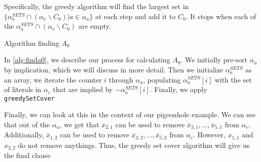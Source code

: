 Specifically, the greedy algorithm will find the largest set in $\{\alpha_a^{SETS} \cap (\alpha_c \backslash C_0) | a \in \alpha_a \}$ at each step and add it to $C_0$. It stops when each of the $\alpha_a^{SETS} \cap (\alpha_c \backslash C_0)$ are empty.


\begin{algorithm}
    \caption{Algorithm finding $A_0$}\label{alg:finda0}
    \SetAlgoNoLine
\end{algorithm}

In \autoref{alg:finda0}, we describe our process for calculating $A_0$. We initially pre-sort $\alpha_a$ by implication, which we will discuss in more detail. Then we initialize $\alpha_a^{SETS}$ as an array, we iterate the counter $i$ through $\alpha_a$, populating $\alpha_a^{SETS}[i]$ with the set of literals in $\alpha_c$ that are implied by $-\alpha_a^{SETS}[i]$. Finally, we apply \texttt{greedySetCover}

Finally, we can look at this in the context of our pigeonhole example. We can see that out of the $\alpha_a$, we get that $\overline{x}_{2, 1}$ can be used to remove $\overline{x}_{3, 1}, \ldots, \overline{x}_{5, 1}$ from $\alpha_c$. Additionally, $\overline{x}_{1, 2}$ can be used to remove $\overline{x}_{3, 2}, \ldots, \overline{x}_{5, 2}$ from $\alpha_c$. However, $x_{1, 1}$ and $x_{2, 2}$ do not remove anythings. Thus, the greedy set cover algorithm will give us the final clause 




